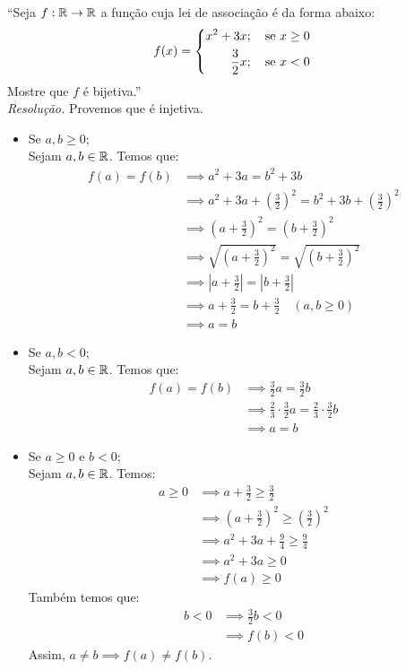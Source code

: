 \enquote{Seja $f: \mathbb R \rightarrow \mathbb R$ a função cuja lei de associação é da forma abaixo:
    \begin{displaymath}
        f(x) = \left\{\begin{aligned}
            x^2 + 3x&; \quad \text{se $x \ge 0$} \\
            \frac{3}{2}x&; \quad \text{se $x < 0$}
        \end{aligned}\\ 
        \right.
    \end{displaymath}
Mostre que $f$ é bijetiva.} \\
\emph{Resolução.} Provemos que é injetiva.
\begin{itemize}
    \item Se $a, b \ge 0$; \\
    Sejam $a, b \in \mathbb R$. Temos que:
    \begin{align*}
        f(a) = f(b) & \implies
        a^2 + 3a = b^2 + 3b \\ & \implies
        a^2 + 3a + (\frac{3}{2})^2 = b^2 + 3b + (\frac{3}{2})^2 \\ & \implies
        (a + \frac{3}{2})^2 = (b + \frac{3}{2})^2 \\ & \implies 
        \sqrt{(a + \frac{3}{2})^2} = \sqrt{(b + \frac{3}{2})^2} \\ & \implies
        |a + \frac{3}{2}| = |b + \frac{3}{2}| \\ & \implies
        a + \frac{3}{2} = b + \frac{3}{2} \quad (a, b \ge 0) \\ & \implies
        a = b
    \end{align*}
    \item Se $a, b < 0$; \\
    Sejam $a, b \in \mathbb R$. Temos que:
    \begin{align*}
        f(a) = f(b) & \implies \frac{3}{2}a = \frac{3}{2}b \\ & \implies
        \frac{2}{3} \cdot \frac{3}{2}a = \frac{2}{3} \cdot \frac{3}{2}b \\ & \implies
        a = b
    \end{align*}
    \item Se $a \ge 0$ e $b < 0$; \\
    Sejam $a, b \in \mathbb R$. Temos:
    \begin{align*}
        a \ge 0 & \implies a + \frac{3}{2} \ge \frac{3}{2} \\ & \implies
        (a + \frac{3}{2})^2 \ge (\frac{3}{2})^2 \\ & \implies
        a^2 + 3a + \frac{9}{4} \ge \frac{9}{4} \\ & \implies
        a^2 + 3a \ge 0 \\ & \implies
        f(a) \ge 0
    \end{align*}
    Também temos que:
    \begin{align*}
        b < 0 & \implies \frac{3}{2}b < 0 \\ & \implies
        f(b) < 0
    \end{align*}
    Assim, $a \ne b \implies f(a) \ne f(b)$.
\end{itemize}
